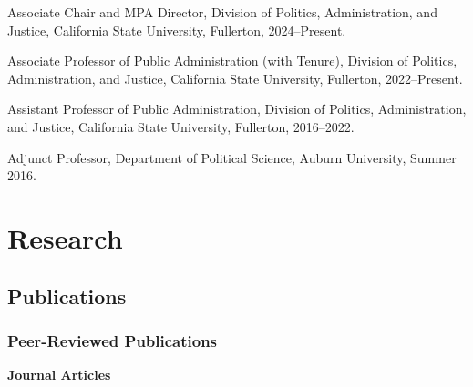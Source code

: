 \documentclass[11pt,letterpaper]{article}
\renewenvironment{itemize}{
  \begin{list}{}{
    \setlength{\leftmargin}{1.5em}
    \setlength{\itemsep}{0.25em}
    \setlength{\parskip}{0pt}
    \setlength{\parsep}{0.25em}
  }
}{
  \end{list}
}
\begin{document}
  \begin{itemize}\leftmargin=2pt\itemindent=-15pt\leftmargin=2pt\itemindent=-15pt
      \item Associate Chair and MPA Director, Division of Politics, Administration, and Justice, California State University, Fullerton, 2024--Present. \vspace{0.2cm}
      \item Associate Professor of Public Administration (with Tenure), Division of Politics, Administration, and Justice, California State University, Fullerton, 2022--Present. \vspace{0.2cm}
      \item Assistant Professor of Public Administration, Division of Politics, Administration, and Justice, California State University, Fullerton,  2016--2022.\vspace{0.2cm}
      \item Adjunct Professor, Department of Political Science, Auburn University, Summer 2016.
  \end{itemize}

\section*{Research}

\subsection*{Publications}

\subsubsection*{Peer-Reviewed Publications}

\textbf{Journal Articles}
\end{document}
